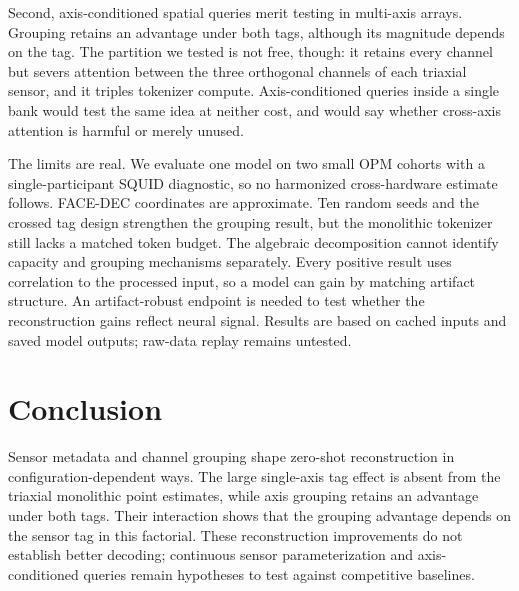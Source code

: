 \documentclass[letterpaper]{article}
\begin{document}
Second, axis-conditioned spatial queries merit testing in multi-axis arrays. Grouping retains an advantage under both tags, although its magnitude depends on the tag. The partition we tested is not free, though: it retains every channel but severs attention between the three orthogonal channels of each triaxial sensor, and it triples tokenizer compute. Axis-conditioned queries inside a single bank would test the same idea at neither cost, and would say whether cross-axis attention is harmful or merely unused.

The limits are real. We evaluate one model on two small OPM cohorts with a single-participant SQUID diagnostic, so no harmonized cross-hardware estimate follows. FACE-DEC coordinates are approximate. Ten random seeds and the crossed tag design strengthen the grouping result, but the monolithic tokenizer still lacks a matched token budget. The algebraic decomposition cannot identify capacity and grouping mechanisms separately. Every positive result uses correlation to the processed input, so a model can gain by matching artifact structure. An artifact-robust endpoint is needed to test whether the reconstruction gains reflect neural signal. Results are based on cached inputs and saved model outputs; raw-data replay remains untested.

\section{Conclusion}
Sensor metadata and channel grouping shape zero-shot reconstruction in configuration-dependent ways. The large single-axis tag effect is absent from the triaxial monolithic point estimates, while axis grouping retains an advantage under both tags. Their interaction shows that the grouping advantage depends on the sensor tag in this factorial. These reconstruction improvements do not establish better decoding; continuous sensor parameterization and axis-conditioned queries remain hypotheses to test against competitive baselines.


\end{document}
